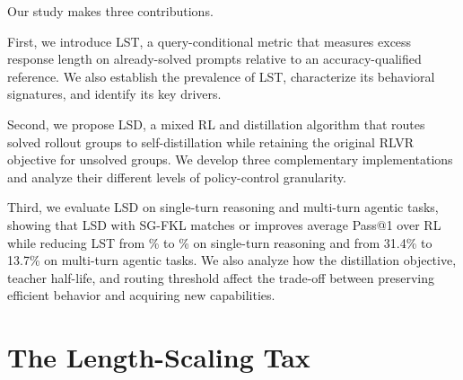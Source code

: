 \documentclass{article} %
\begin{document}

Our study makes three contributions. 

First, we introduce LST, a query-conditional metric that measures
excess response length on already-solved prompts relative to an
accuracy-qualified reference. We also establish the prevalence of LST, characterize its behavioral signatures, and identify its key drivers.

Second, we propose LSD, a mixed RL and
distillation algorithm that routes solved rollout groups to self-distillation
while retaining the original RLVR objective for unsolved groups. We develop
three complementary implementations and analyze their
different levels of policy-control granularity.

Third, we evaluate LSD on single-turn reasoning and multi-turn agentic tasks, showing that LSD with SG-FKL matches or improves average Pass@1 over RL while reducing LST from \mainLSTRLShort\% to \mainLSTFKLShort\% on single-turn reasoning and from 31.4\% to 13.7\% on multi-turn agentic tasks. We also analyze how the distillation objective, teacher half-life, and routing threshold affect the trade-off between preserving efficient behavior and acquiring new capabilities.


\section{The Length-Scaling Tax}
\label{sec:lst}
\end{document}

